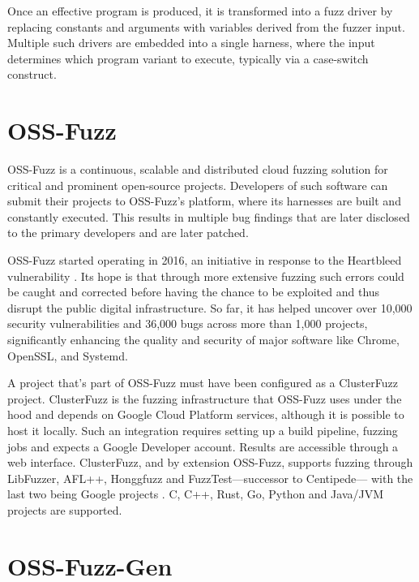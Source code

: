 \documentclass[
  a4paper,
]{scrreprt}
\theoremstyle{definition}
\theoremstyle{remark}
\begin{document}
Once an effective program is produced, it is transformed into a fuzz
driver by replacing constants and arguments with variables derived from
the fuzzer input. Multiple such drivers are embedded into a single
harness, where the input determines which program variant to execute,
typically via a case-switch construct.

\section{OSS-Fuzz}\label{sec-oss-fuzz}

OSS-Fuzz \autocite{ossfuzzdocs2025,oss-fuzz} is a continuous, scalable
and distributed cloud fuzzing solution for critical and prominent
open-source projects. Developers of such software can submit their
projects to OSS-Fuzz's platform, where its harnesses are built and
constantly executed. This results in multiple bug findings that are
later disclosed to the primary developers and are later patched.

OSS-Fuzz started operating in 2016, an initiative in response to the
Heartbleed vulnerability
\autocite{heartbleed-cve,wheeler2014,heartbleed}. Its hope is that
through more extensive fuzzing such errors could be caught and corrected
before having the chance to be exploited and thus disrupt the public
digital infrastructure. So far, it has helped uncover over 10,000
security vulnerabilities and 36,000 bugs across more than 1,000
projects, significantly enhancing the quality and security of major
software like Chrome, OpenSSL, and Systemd.

A project that's part of OSS-Fuzz must have been configured as a
ClusterFuzz \autocite{clusterfuzz} project. ClusterFuzz is the fuzzing
infrastructure that OSS-Fuzz uses under the hood and depends on Google
Cloud Platform services, although it is possible to host it locally.
Such an integration requires setting up a build pipeline, fuzzing jobs
and expects a Google Developer account. Results are accessible through a
web interface. ClusterFuzz, and by extension OSS-Fuzz, supports fuzzing
through LibFuzzer, AFL++, Honggfuzz and FuzzTest---successor to
Centipede--- with the last two being Google projects
\autocite{libfuzzer,fuzztest,honggfuzz,aflpp}. C, C++, Rust, Go, Python
and Java/JVM projects are supported.

\section{OSS-Fuzz-Gen}\label{sec-ofg}
\end{document}
